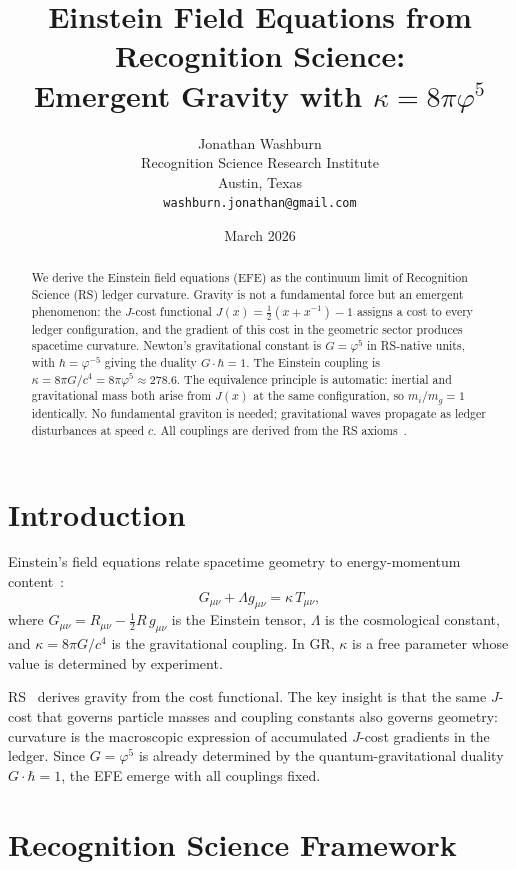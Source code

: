 \documentclass[12pt,a4paper]{article}
\title{Einstein Field Equations from Recognition Science:\\
Emergent Gravity with $\kappa = 8\pi\varphi^5$}
\author{Jonathan Washburn\\
Recognition Science Research Institute\\
Austin, Texas\\
\texttt{washburn.jonathan@gmail.com}}
\date{March 2026}
\theoremstyle{definition}
\theoremstyle{remark}
\begin{document}
\maketitle

\begin{abstract}
We derive the Einstein field equations (EFE) as the continuum limit
of Recognition Science (RS) ledger curvature.  Gravity is not a
fundamental force but an emergent phenomenon: the $J$-cost
functional $J(x) = \tfrac{1}{2}(x + x^{-1}) - 1$ assigns a cost
to every ledger configuration, and the gradient of this cost in the
geometric sector produces spacetime curvature.  Newton's
gravitational constant is $G = \varphi^5$ in RS-native units,
with $\hbar = \varphi^{-5}$ giving the duality $G \cdot \hbar = 1$.
The Einstein coupling is $\kappa = 8\pi G/c^4 = 8\pi\varphi^5
\approx 278.6$.  The equivalence principle is automatic: inertial
and gravitational mass both arise from $J(x)$ at the same
configuration, so $m_i/m_g = 1$ identically.  No fundamental
graviton is needed; gravitational waves propagate as ledger
disturbances at speed $c$.  All couplings are derived from the RS axioms~\cite{RS_Axioms}.
\end{abstract}

\section{Introduction}
\label{sec:intro}

Einstein's field equations relate spacetime geometry to
energy-momentum content~\cite{Einstein1916}:
\begin{equation}
  G_{\mu\nu} + \Lambda g_{\mu\nu}
  = \kappa\, T_{\mu\nu},
\end{equation}
where $G_{\mu\nu} = R_{\mu\nu} - \tfrac{1}{2}R\,g_{\mu\nu}$ is
the Einstein tensor, $\Lambda$ is the cosmological constant, and
$\kappa = 8\pi G/c^4$ is the gravitational coupling.  In GR,
$\kappa$ is a free parameter whose value is determined by
experiment.

RS~\cite{RS_Axioms} derives gravity from the cost functional.  The key insight is
that the same $J$-cost that governs particle masses and coupling
constants also governs geometry: curvature is the macroscopic
expression of accumulated $J$-cost gradients in the ledger.
Since $G = \varphi^5$ is already determined by the
quantum-gravitational duality $G \cdot \hbar = 1$, the EFE
emerge with all couplings fixed.

\section{Recognition Science Framework}
\label{sec:framework}
\end{document}
